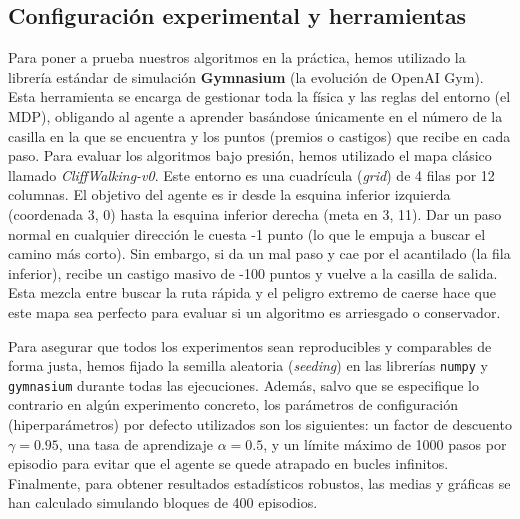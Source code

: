 \subsection{Configuración experimental y herramientas}
Para poner a prueba nuestros algoritmos en la práctica, hemos utilizado la librería estándar de simulación \textbf{Gymnasium} (la evolución de OpenAI Gym). Esta herramienta se encarga de gestionar toda la física y las reglas del entorno (el MDP), obligando al agente a aprender basándose únicamente en el número de la casilla en la que se encuentra y los puntos (premios o castigos) que recibe en cada paso.
Para evaluar los algoritmos bajo presión, hemos utilizado el mapa clásico llamado \textit{CliffWalking-v0}. Este entorno es una cuadrícula (\textit{grid}) de 4 filas por 12 columnas. El objetivo del agente es ir desde la esquina inferior izquierda (coordenada 3, 0) hasta la esquina inferior derecha (meta en 3, 11). Dar un paso normal en cualquier dirección le cuesta -1 punto (lo que le empuja a buscar el camino más corto). Sin embargo, si da un mal paso y cae por el acantilado (la fila inferior), recibe un castigo masivo de -100 puntos y vuelve a la casilla de salida. Esta mezcla entre buscar la ruta rápida y el peligro extremo de caerse hace que este mapa sea perfecto para evaluar si un algoritmo es arriesgado o conservador.

Para asegurar que todos los experimentos sean reproducibles y comparables de forma justa, hemos fijado la semilla aleatoria (\textit{seeding}) en las librerías \texttt{numpy} y \texttt{gymnasium} durante todas las ejecuciones. Además, salvo que se especifique lo contrario en algún experimento concreto, los parámetros de configuración (hiperparámetros) por defecto utilizados son los siguientes: un factor de descuento $\gamma = 0.95$, una tasa de aprendizaje $\alpha = 0.5$, y un límite máximo de 1000 pasos por episodio para evitar que el agente se quede atrapado en bucles infinitos. Finalmente, para obtener resultados estadísticos robustos, las medias y gráficas se han calculado simulando bloques de 400 episodios.

